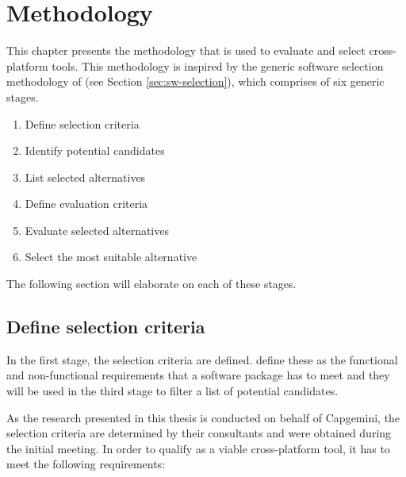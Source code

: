 \chapter{Methodology}
\label{chap:methodology}

This chapter presents the methodology that is used to evaluate and select cross-platform tools. This methodology is inspired by the generic software selection methodology of \citet{Jadhav:2011}  (see Section \ref{sec:sw-selection}), which comprises of six generic stages.

\begin{enumerate}
    \item Define selection criteria
    \item Identify potential candidates
    \item List selected alternatives
    \item Define evaluation criteria
    \item Evaluate selected alternatives
    \item Select the most suitable alternative
\end{enumerate}

The following section will elaborate on each of these stages.

\section{Define selection criteria}
\label{sec:selection-criteria}

In the first stage, the selection criteria are defined. \citet{Jadhav:2011} define these as the functional and non-functional requirements that a software package has to meet and they will be used in the third stage to filter a list of potential candidates. 

As the research presented in this thesis is conducted on behalf of Capgemini, the selection criteria are determined by their consultants and were obtained during the initial meeting. In order to qualify as a viable cross-platform tool, it has to meet the following requirements:

